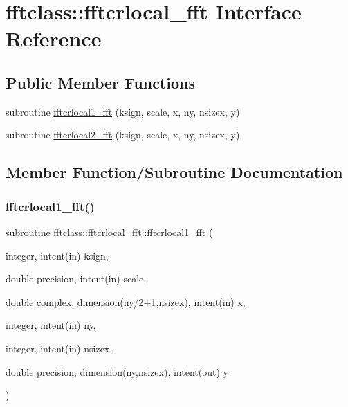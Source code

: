 \hypertarget{interfacefftclass_1_1fftcrlocal__fft}{}\section{fftclass\+::fftcrlocal\+\_\+fft Interface Reference}
\label{interfacefftclass_1_1fftcrlocal__fft}
\subsection*{Public Member Functions}
\begin{DoxyCompactItemize}
\item 
subroutine \mbox{\hyperlink{interfacefftclass_1_1fftcrlocal__fft_ae458f5a2de29f771c763c56da7d84c09}{fftcrlocal1\+\_\+fft}} (ksign, scale, x, ny, nsizex, y)
\item 
subroutine \mbox{\hyperlink{interfacefftclass_1_1fftcrlocal__fft_a61c3b16caab87c9a268ae178f67aea26}{fftcrlocal2\+\_\+fft}} (ksign, scale, x, ny, nsizex, y)
\end{DoxyCompactItemize}


\subsection{Member Function/\+Subroutine Documentation}
\mbox{\label{interfacefftclass_1_1fftcrlocal__fft_ae458f5a2de29f771c763c56da7d84c09}} 
\subsubsection{\texorpdfstring{fftcrlocal1\_fft()}{fftcrlocal1\_fft()}}
{\footnotesize\ttfamily subroutine fftclass\+::fftcrlocal\+\_\+fft\+::fftcrlocal1\+\_\+fft (\begin{DoxyParamCaption}\item[{integer, intent(in)}]{ksign,  }\item[{double precision, intent(in)}]{scale,  }\item[{double complex, dimension(ny/2+1,nsizex), intent(in)}]{x,  }\item[{integer, intent(in)}]{ny,  }\item[{integer, intent(in)}]{nsizex,  }\item[{double precision, dimension(ny,nsizex), intent(out)}]{y }\end{DoxyParamCaption})}

